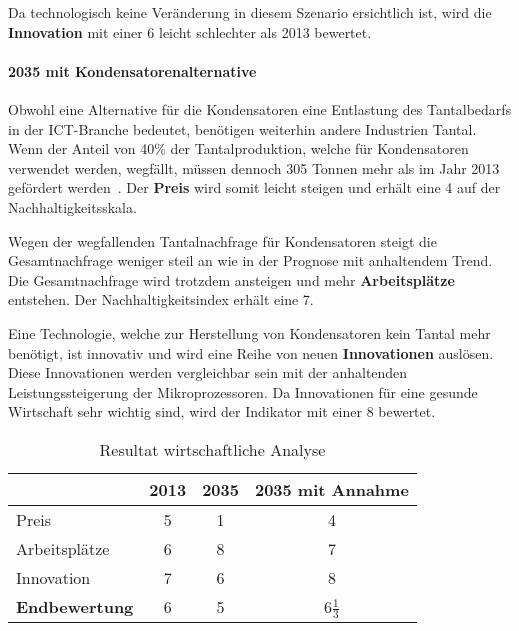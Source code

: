 Da technologisch keine Veränderung in diesem Szenario ersichtlich ist, wird die \textbf{Innovation} mit einer 6 leicht schlechter als 2013 bewertet.

\paragraph{2035 mit Kondensatorenalternative}
Obwohl eine Alternative für die Kondensatoren eine Entlastung des Tantalbedarfs in der ICT-Branche bedeutet, benötigen weiterhin andere Industrien Tantal. Wenn der Anteil von 40\% der Tantalproduktion, welche für Kondensatoren verwendet werden, wegfällt, müssen dennoch 305 Tonnen mehr als im Jahr 2013 gefördert werden~\cite{tantal_price2}. Der \textbf{Preis} wird somit leicht steigen und erhält eine 4 auf der Nachhaltigkeitsskala.

Wegen der wegfallenden Tantalnachfrage für Kondensatoren steigt die Gesamtnachfrage weniger steil an wie in der Prognose mit anhaltendem Trend. Die Gesamtnachfrage wird trotzdem ansteigen und mehr \textbf{Arbeitsplätze} entstehen. Der Nachhaltigkeitsindex erhält eine 7.

Eine Technologie, welche zur Herstellung von Kondensatoren kein Tantal mehr benötigt, ist innovativ und wird eine Reihe von neuen \textbf{Innovationen} auslösen. Diese Innovationen werden vergleichbar sein mit der anhaltenden Leistungssteigerung der Mikroprozessoren. Da Innovationen für eine gesunde Wirtschaft sehr wichtig sind, wird der Indikator mit einer 8 bewertet.

\begin{table}[h]
  \centering
  \begin{tabular}{l|ccc}            & \textbf{2013} & \textbf{2035} & \textbf{2035 mit Annahme}
    \\ \hline Preis                 & 5             & 1             & 4
    \\ Arbeitsplätze                & 6             & 8             & 7
    \\ Innovation                   & 7             & 6             & 8
    \\ \hline \textbf{Endbewertung} & 6             & 5             & 6\(\frac{1}{3}\)
  \end{tabular}
  \caption{Resultat wirtschaftliche Analyse}
\end{table}
